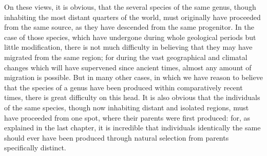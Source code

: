 \indent On these views, it is obvious, that the several species of the same genus, though inhabiting the most distant quarters of the world, must originally have proceeded from the same source, as they have descended from the same progenitor. In the case of those species, which have undergone during whole geological periods but little modification, there is not much difficulty in believing that they may have migrated from the same region; for during the vast geographical and climatal changes which will have supervened since ancient times, almost any amount of migration is possible. But in many other cases, in which we have reason to believe that the species of a genus have been produced within comparatively recent times, there is great difficulty on this head. It is also obvious that the individuals of the same species, though now inhabiting distant and isolated regions, must have proceeded from one spot, where their parents were first produced: for, as explained in the last chapter, it is incredible that individuals identically the same should ever have been produced through natural selection from parents specifically distinct.~\\
